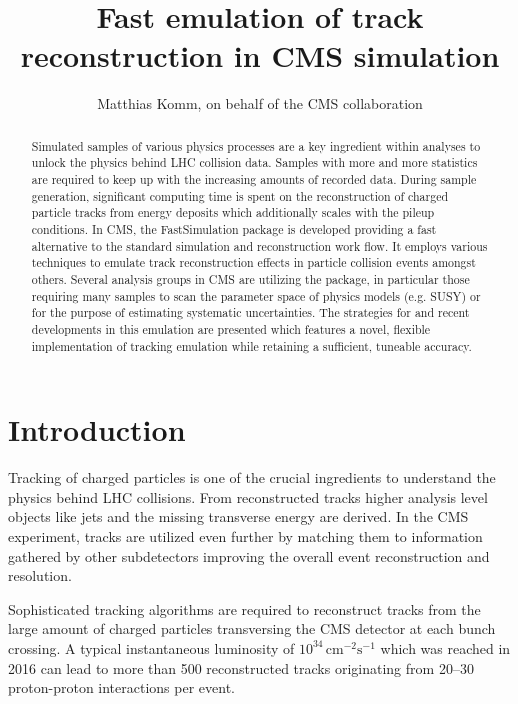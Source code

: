 \documentclass[a4paper]{jpconf}
\begin{document}
\title{Fast emulation of track reconstruction in CMS simulation}

\author{Matthias Komm, on behalf of the CMS collaboration}

\address{Centre for Cosmology, Particle Physics and Phenomenology,
Universit\'e catholique de Louvain, Louvain-la-Neuve, BELGIUM}


\begin{abstract}
Simulated samples of various physics processes are a key ingredient within analyses to unlock the physics behind LHC collision data. Samples with more and more statistics are required to keep up with the increasing amounts of recorded data. During sample generation, significant computing time is spent on the reconstruction of charged particle tracks from energy deposits which additionally scales with the pileup conditions. In CMS, the FastSimulation package is developed providing a fast alternative to the standard simulation and reconstruction work flow. It employs various techniques to emulate track reconstruction effects in particle collision events amongst others. Several analysis groups in CMS are utilizing the package, in particular those requiring many samples to scan the parameter space of physics models (e.g. SUSY) or for the purpose of estimating systematic uncertainties. The strategies for and recent developments in this emulation are presented which features a novel, flexible implementation of tracking emulation while retaining a sufficient, tuneable accuracy.
\end{abstract}


\section{Introduction}
Tracking of charged particles is one of the crucial ingredients to understand the physics behind LHC collisions. From reconstructed tracks higher analysis level objects like jets and the missing transverse energy are derived. In the CMS experiment, tracks are utilized even further by matching them to information gathered by other subdetectors improving the overall event reconstruction and resolution.

Sophisticated tracking algorithms are required to reconstruct tracks from the large amount of charged particles transversing the CMS detector at each bunch crossing. A typical instantaneous luminosity of $10^{34}\,\mathrm{cm}^{-2}\mathrm{s}^{-1}$ which was reached in 2016 can lead to more than 500 reconstructed tracks originating from 20--30 proton-proton interactions per event.
\end{document}
